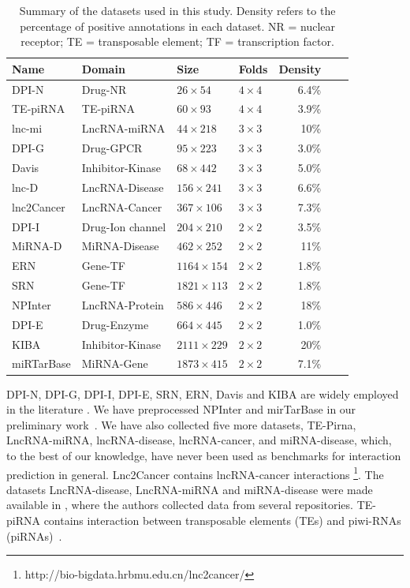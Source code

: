 \documentclass[letterpaper]{article}
\begin{document}
\begin{table}[ht]
\centering
\small
\setlength{\tabcolsep}{1mm}  %
\begin{tabular}{llllrrl}
\toprule
Name & Domain & Size & Folds & Density \\
\midrule
DPI-N & Drug-NR & $26 \times 54$ & $4 \times 4$ & 6.4\% \\
TE-piRNA & TE-piRNA & $60 \times 93$ & $4 \times 4$ & 3.9\% \\
lnc-mi & LncRNA-miRNA & $44 \times 218$ & $3 \times 3$ & 10\% \\
DPI-G & Drug-GPCR & $95 \times 223$ & $3 \times 3$ & 3.0\% \\
Davis & Inhibitor-Kinase & $68 \times 442$ & $3 \times 3$ & 5.0\% \\
lnc-D & LncRNA-Disease & $156 \times 241$ & $3 \times 3$ & 6.6\% \\
lnc2Cancer & LncRNA-Cancer & $367 \times 106$ & $3 \times 3$ & 7.3\% \\
DPI-I & Drug-Ion channel & $204 \times 210$ & $2 \times 2$ & 3.5\% \\
MiRNA-D & MiRNA-Disease & $462 \times 252$ & $2 \times 2$ & 11\% \\
ERN & Gene-TF & $1164 \times 154$ & $2 \times 2$ & 1.8\% \\
SRN & Gene-TF & $1821 \times 113$ & $2 \times 2$ & 1.8\% \\
NPInter & LncRNA-Protein & $586 \times 446$ & $2 \times 2$ & 18\% \\
DPI-E & Drug-Enzyme & $664 \times 445$ & $2 \times 2$ & 1.0\% \\
KIBA & Inhibitor-Kinase & $2111 \times 229$ & $2 \times 2$ & 20\% \\
miRTarBase & MiRNA-Gene & $1873 \times 415$ & $2 \times 2$ & 7.1\% \\
\bottomrule
\end{tabular}
\caption{Summary of the datasets used in this study. Density refers to the percentage of positive annotations in each dataset. NR = nuclear receptor; TE = transposable element; TF = transcription factor.}
\label{tab:datasets}
\end{table}

DPI-N, DPI-G, DPI-I, DPI-E, SRN, ERN, Davis and KIBA are widely employed in the literature \cite{schrynemackers_classifying_2015,pliakos_network_2019,huang_moltrans_2020}. We have preprocessed NPInter and mirTarBase in our preliminary work~\cite{ilidio_fast_2024}. We have also collected five more datasets, TE-Pirna, LncRNA-miRNA, lncRNA-disease, lncRNA-cancer, and miRNA-disease, which, to the best of our knowledge, have never been used as benchmarks for interaction prediction in general.
%
Lnc2Cancer contains lncRNA-cancer interactions \cite{gao2021lnc2cancer}\footnote{http://bio-bigdata.hrbmu.edu.cn/lnc2cancer/}.
%
The datasets LncRNA-disease, LncRNA-miRNA and miRNA-disease were made available in \cite{sheng2023data}, where the authors collected data from several repositories.
%
TE-piRNA contains interaction between transposable elements (TEs) and piwi-RNAs (piRNAs)~\cite{dos2024transposable}.
\end{document}

